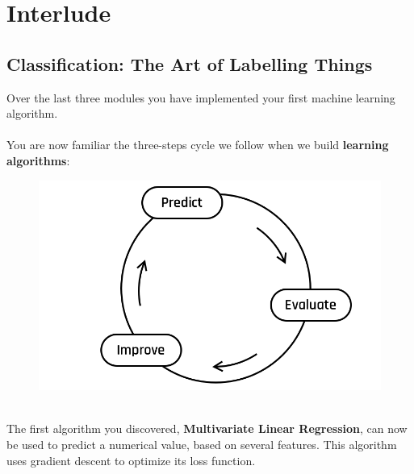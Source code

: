 
\section*{Interlude}
\subsection*{Classification: The Art of Labelling Things}
Over the last three modules you have implemented your first machine learning algorithm.\\
\\
You are now familiar the three-steps cycle we follow when we build \textbf{learning algorithms}:
\\
\begin{figure}[!h]
    \centering
    \includegraphics[scale=0.25]{assets/Default.png}
\end{figure}
\\
The first algorithm you discovered, \textbf{Multivariate Linear Regression}, can now be used to predict a numerical value, based on several features.
This algorithm uses gradient descent to optimize its loss function.\\
